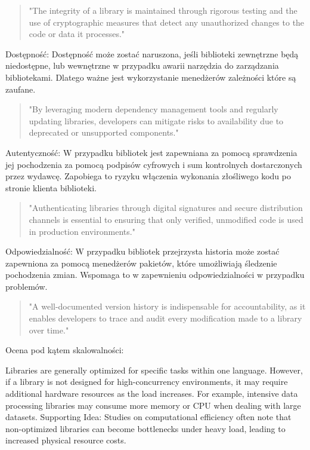 \documentclass[runningheads,12pt]{llncs}
\begin{document}
\begin{quote}
    "The integrity of a library is maintained through rigorous testing and the use of cryptographic measures that detect any unauthorized changes to the code or data it processes." ~\cite[p. 84]{Essential}
\end{quote}

Dostępność: Dostępność może zostać naruszona, jeśli biblioteki zewnętrzne będą niedostępne, lub wewnętrzne w przypadku awarii narzędzia do zarządzania bibliotekami. Dlatego ważne jest wykorzystanie menedżerów zależności które są zaufane.

\begin{quote}
    "By leveraging modern dependency management tools and regularly updating libraries, developers can mitigate risks to availability due to deprecated or unsupported components." ~\cite[p. 85]{Essential}
\end{quote}

Autentyczność: W przypadku bibliotek jest zapewniana za pomocą sprawdzenia jej pochodzenia za pomocą podpisów cyfrowych i sum kontrolnych dostarczonych przez wydawcę. Zapobiega to ryzyku włączenia wykonania złośliwego kodu po stronie klienta biblioteki.

\begin{quote}
    "Authenticating libraries through digital signatures and secure distribution channels is essential to ensuring that only verified, unmodified code is used in production environments." ~\cite[p. 87]{Essential}
\end{quote}

Odpowiedzialność: W przypadku bibliotek przejrzysta historia może zostać zapewniona za pomocą menedżerów pakietów, które umożliwiają śledzenie pochodzenia zmian. Wspomaga to w zapewnieniu odpowiedzialności w przypadku problemów.

\begin{quote}
    "A well-documented version history is indispensable for accountability, as it enables developers to trace and audit every modification made to a library over time." ~\cite[p. 88]{Essential}
\end{quote}

Ocena pod kątem skalowalności:

Libraries are generally optimized for specific tasks within one language. However, if a library is not designed for high-concurrency environments, it may require additional hardware resources as the load increases. For example, intensive data processing libraries may consume more memory or CPU when dealing with large datasets. Supporting Idea: Studies on computational efficiency often note that non-optimized libraries can become bottlenecks under heavy load, leading to increased physical resource costs.
\end{document}
